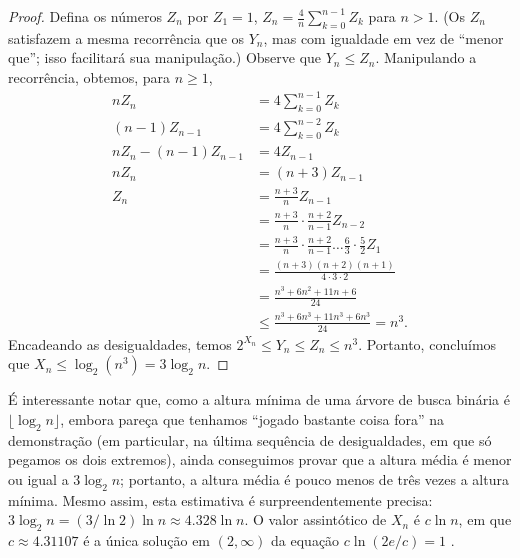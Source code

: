 \begin{proof}
    Defina os números $Z_n$ por $Z_1 = 1$,
    $Z_n = \frac 4 n \sum_{k = 0}^{n-1} Z_k$ para $n > 1$.
    (Os $Z_n$ satisfazem a mesma recorrência que os $Y_n$,
    mas com igualdade em vez de ``menor que'';
    isso facilitará sua manipulação.)
    Observe que $Y_n \leq Z_n$.
    Manipulando a recorrência, obtemos, para $n \geq 1$,
    \begin{align*}
        n Z_n &= 4 \sum_{k = 0}^{n-1} Z_k \\
        (n-1) Z_{n-1} &= 4 \sum_{k = 0}^{n-2} Z_k \\
        n Z_n - (n-1) Z_{n-1} &= 4 Z_{n-1} \\
        n Z_n &= (n+3) Z_{n-1} \\
        Z_n &= \frac{n+3}{n} Z_{n-1} \\
            &= \frac{n+3}{n} \cdot \frac{n+2}{n-1} Z_{n-2} \\
            &= \frac{n+3}{n} \cdot \frac{n+2}{n-1} \dots \frac 6 3 \cdot \frac 5 2 Z_1 \\
            &= \frac{(n+3)(n+2)(n+1)}{4 \cdot 3 \cdot 2} \\
            &= \frac{n^3 + 6n^2 + 11n + 6}{24} \\
            &\leq \frac {n^3 + 6n^3 + 11n^3 + 6n^3}{24} = n^3.
    \end{align*}
    Encadeando as desigualdades, temos $2^{X_n} \leq Y_n \leq Z_n \leq n^3$.
    Portanto, concluímos que $X_n \leq \log_2(n^3) = 3 \log_2 n$.
\end{proof}

É interessante notar que,
como a altura mínima de uma árvore de busca binária é $\lfloor \log_2 n \rfloor$,
embora pareça que tenhamos ``jogado bastante coisa fora'' na demonstração
(em particular, na última sequência de desigualdades, em que só pegamos os dois extremos),
ainda conseguimos provar que a altura média é menor ou igual a $3 \log_2 n$;
portanto,
a altura média é pouco menos de três vezes a altura mínima.
Mesmo assim,
esta estimativa é surpreendentemente precisa:
$3 \log_2 n = (3/\ln 2) \ln n \approx 4.328 \ln n$.
O valor assintótico de $X_n$ é $c \ln n$,
em que $c \approx 4.31107$ é a única solução em $(2, \infty)$ da equação $c \ln(2e/c) = 1$
\cite[p.~308]{SedgewickFlajolet2013}.
